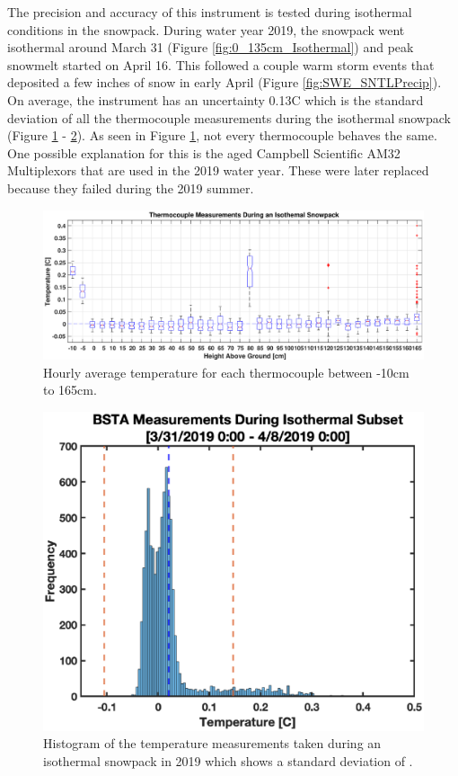 The precision and accuracy of this instrument is tested during isothermal conditions in the snowpack. During water year 2019, the snowpack went isothermal around March 31 (Figure \ref{fig:0_135cm_Isothermal}) and peak snowmelt started on April 16. This followed a couple warm storm events that deposited a few inches of snow in early April (Figure \ref{fig:SWE_SNTLPrecip}). On average, the instrument has an uncertainty 0.13\textdegree C which is the standard deviation of all the thermocouple measurements during the isothermal snowpack (Figure \ref{fig:IsothermBoxplot} - \ref{fig:Iso_Temp_Hist}). As seen in Figure \ref{fig:IsothermBoxplot}, not every thermocouple behaves the same. One possible explanation for this is the aged Campbell Scientific AM32 Multiplexors that are used in the 2019 water year. These were later replaced because they failed during the 2019 summer.  

\begin{figure}
    \includegraphics[width=1\linewidth]{figures/TCArray/Isothermal_Boxplot.eps}
    \caption{Hourly average temperature for each thermocouple between -10cm to 165cm.}
    \label{fig:IsothermBoxplot}
 \end{figure}

\begin{figure}[H]
    \centering
    \includegraphics[width=0.7\linewidth]{figures/Uncertainty/Isothermal_Temp_Hist.eps}
    \caption{Histogram of the temperature measurements taken during an isothermal snowpack in 2019 which shows a standard deviation of \isostd.}
    \label{fig:Iso_Temp_Hist}
\end{figure}

